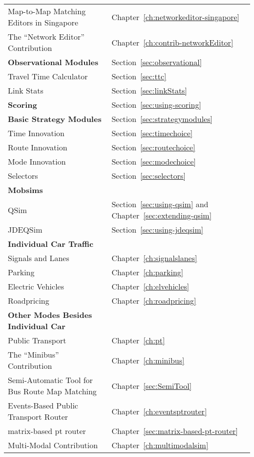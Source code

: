 \begin{center}
\begin{longtable}{|l|l|}
		Map-to-Map Matching Editors in Singapore & Chapter~\ref{ch:networkeditor-singapore} \\
		The ``Network Editor'' Contribution & Chapter~\ref{ch:contrib-networkEditor} \\
	\hline
		\textbf{Observational Modules} & Section~\ref{sec:observational}\\
	\hline
	Travel Time Calculator & Section~\ref{sec:ttc} \\
	Link Stats & Section~\ref{sec:linkStats} \\
	\hline
		\textbf{Scoring} & Section~\ref{sec:using-scoring} \\
	\hline
		\textbf{Basic Strategy Modules} & Section~\ref{sec:strategymodules} \\
	\hline
	Time Innovation & Section~\ref{sec:timechoice} \\
	Route Innovation & Section~\ref{sec:routechoice} \\
	Mode Innovation & Section~\ref{sec:modechoice} \\
	Selectors & Section~\ref{sec:selectors} \\
	\hline
		\textbf{Mobsims} &\\ %
	\hline
	QSim & Section~\ref{sec:using-qsim} and Chapter~\ref{sec:extending-qsim} \\
	JDEQSim & Section~\ref{sec:using-jdeqsim} \\
	\hline
		\textbf{Individual Car Traffic} &\\ %
	\hline
	Signals and Lanes & Chapter~\ref{ch:signalslanes} \\
	Parking & Chapter~\ref{ch:parking} \\
	Electric Vehicles & Chapter~\ref{ch:elvehicles} \\
	Roadpricing & Chapter~\ref{ch:roadpricing} \\
	\hline
		\textbf{Other Modes Besides Individual Car} & \\
	\hline
	Public Transport & Chapter~\ref{ch:pt} \\
	The ``Minibus'' Contribution & Chapter~\ref{ch:minibus} \\
	Semi-Automatic Tool for Bus Route Map Matching & Chapter~\ref{sec:SemiTool} \\
	Events-Based Public Transport Router & Chapter~\ref{ch:eventsptrouter} \\
	matrix-based pt router & Chapter~\ref{sec:matrix-based-pt-router} \\
	Multi-Modal Contribution & Chapter~\ref{ch:multimodalsim} \\ %

\end{longtable}
\end{center}
